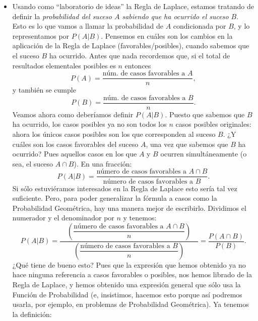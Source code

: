 \begin{itemize}
    \item Usando como ``laboratorio de ideas'' la Regla de Laplace, estamos tratando de definir la {\em probabilidad del suceso $A$ sabiendo que ha ocurrido el suceso $B$}. Esto es lo que vamos a llamar la {\sf probabilidad de $A$ condicionada por $B$, y lo representamos por $P(A|B)$}. Pensemos en cuáles son los cambios en la aplicación de la Regla de Laplace (favorables/posibles), cuando sabemos que el suceso $B$ ha ocurrido. Antes que nada recordemos que, si el total de resultados elementales posibles es $n$ entonces
        \[P(A)=\dfrac{\mbox{núm. de casos favorables a $A$}}{n},\]
        y también se cumple
        \[P(B)=\dfrac{\mbox{núm. de casos favorables a $B$}}{n}.\]
        Veamos ahora como deberíamos definir $P(A|B)$. Puesto que sabemos que $B$ ha ocurrido, los casos posibles ya no son todos los $n$ casos posibles originales: ahora los únicos casos posibles son los que corresponden al suceso $B$.  ¿Y cuáles son los casos favorables del suceso $A$, una vez que sabemos que $B$ ha ocurrido? Pues aquellos casos en los que $A$ y $B$ ocurren simultáneamente (o sea, el suceso $A\cap B$). En una fracción:
        \[P(A|B)=\dfrac{\mbox{número de casos favorables a $A\cap B$}}{\mbox{número de casos favorables a $B$}}.\]
        Si sólo estuviéramos interesados en la Regla de Laplace esto sería tal vez suficiente. Pero, para poder generalizar la fórmula a casos como la Probabilidad Geométrica, hay una manera mejor de escribirlo. Dividimos el numerador y el denominador por $n$ y tenemos:
        \[P(A|B)=\dfrac{\quad\left(\dfrac{\mbox{número de casos favorables a $A\cap B$}}{n}\right)\quad}{\left(\dfrac{\mbox{número de casos favorables a $B$}}{n}\right)}=\dfrac{P(A\cap B)}{P(B)}.\]
        ¿Qué tiene de bueno esto? Pues que la expresión que hemos obtenido ya no hace ninguna referencia a casos favorables o posibles, nos hemos librado de la Regla de Laplace, y hemos obtenido una expresión general que sólo usa la Función de Probabilidad (e, insistimos, hacemos esto porque así podremos usarla, por ejemplo, en problemas de Probabilidad Geométrica). Ya tenemos la definición:
        \begin{center}
        \end{center}


\end{itemize}
